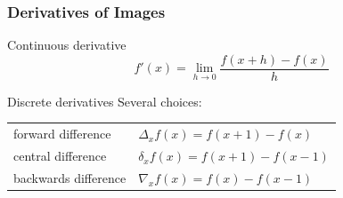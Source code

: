 \begin{frame}
    \frametitle{Derivatives of Images}
    \begin{block}{Continuous derivative}
        \begin{equation*}
            f'(x) = \lim_{h\rightarrow0}\frac{f(x+h)-f(x)}{h}
        \end{equation*}
    \end{block}
    \begin{block}{Discrete derivatives}
        Several choices:

        \begin{center}
            \begin{tabularx}{0.8\textwidth}{lX}
                forward difference                    & $\Delta_x f(x) = f(x+1) - f(x)$   \\
                \rule{0pt}{1.5em}central difference   & $\delta_x f(x) = f(x+1) - f(x-1)$ \\
                \rule{0pt}{1.5em}backwards difference & $\nabla_x f(x) = f(x) - f(x-1)$
            \end{tabularx}
        \end{center}
    \end{block}
\end{frame}

